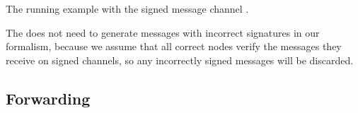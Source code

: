 \begin{algorithm}[t]
\caption{The running example with the signed message channel \randomHarness{}.}
\label{alg:running-example-signed-harness}
\end{algorithm}

The \randomSimulator{} does not need to generate messages with incorrect signatures in our formalism, because we assume that all correct nodes verify the messages they receive on signed channels, so any incorrectly signed messages will be discarded.





\subsection{Forwarding}
\label{sec:forwarding}

